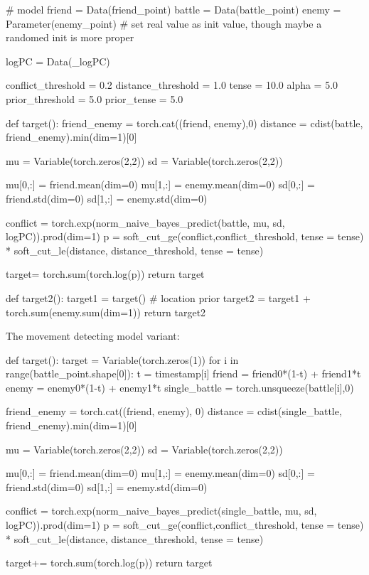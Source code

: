 \documentclass{article}
\begin{document}
\begin{python}

# model
friend = Data(friend_point)
battle = Data(battle_point)
enemy = Parameter(enemy_point) # set real value as init value, though maybe a randomed init is more proper

logPC = Data(_logPC)

conflict_threshold = 0.2
distance_threshold = 1.0
tense = 10.0
alpha = 5.0
prior_threshold = 5.0
prior_tense = 5.0

def target():
    friend_enemy = torch.cat((friend, enemy),0)
    distance = cdist(battle, friend_enemy).min(dim=1)[0]
    

    mu = Variable(torch.zeros(2,2)) 
    sd = Variable(torch.zeros(2,2))
    
    mu[0,:] = friend.mean(dim=0)
    mu[1,:] = enemy.mean(dim=0)
    sd[0,:] = friend.std(dim=0)
    sd[1,:] = enemy.std(dim=0)
    
    conflict = torch.exp(norm_naive_bayes_predict(battle, mu, sd, logPC)).prod(dim=1)
    p = soft_cut_ge(conflict,conflict_threshold, tense = tense) * soft_cut_le(distance, distance_threshold, tense = tense)
    
    target= torch.sum(torch.log(p))
    return target

def target2():
    target1 = target()
    # location prior
    target2 = target1 + torch.sum(enemy.sum(dim=1))
    return target2

\end{python}

The movement detecting model variant:

\begin{python}
def target():
    target = Variable(torch.zeros(1))
    for i in range(battle_point.shape[0]):
        t = timestamp[i]
        friend = friend0*(1-t) + friend1*t
        enemy = enemy0*(1-t) + enemy1*t
        single_battle = torch.unsqueeze(battle[i],0) 
        
        friend_enemy = torch.cat((friend, enemy), 0)
        distance = cdist(single_battle, friend_enemy).min(dim=1)[0]
        
        mu = Variable(torch.zeros(2,2)) 
        sd = Variable(torch.zeros(2,2))

        mu[0,:] = friend.mean(dim=0)
        mu[1,:] = enemy.mean(dim=0)
        sd[0,:] = friend.std(dim=0)
        sd[1,:] = enemy.std(dim=0)

        conflict = torch.exp(norm_naive_bayes_predict(single_battle, mu, sd, logPC)).prod(dim=1)
        p = soft_cut_ge(conflict,conflict_threshold, tense = tense) * soft_cut_le(distance, distance_threshold, tense = tense)

        target+= torch.sum(torch.log(p))
    return target

\end{python}
\end{document}
